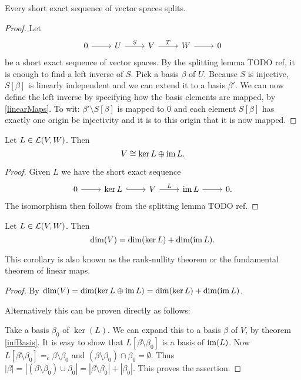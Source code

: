 \begin{theorem}
Every short exact sequence of vector spaces splits.
\end{theorem}
\begin{proof}
Let
\[ \begin{tikzcd}
0 \rar & U \rar{S} & V \rar{T} & W \rar & 0
\end{tikzcd} \]
be a short exact sequence of vector spaces.
By the splitting lemma TODO ref, it is enough to find a left inverse of $S$. Pick a basis $\beta$ of $U$. Because $S$ is injective, $S[\beta]$ is linearly independent and we can extend it to a basis $\beta'$. We can now define the left inverse by specifying how the basis elements are mapped, by \ref{linearMaps}. To wit: $\beta'\setminus S[\beta]$ is mapped to $0$ and each element $S[\beta]$ has exactly one origin be injectivity and it is to this origin that it is now mapped.
\end{proof}
\begin{corollary} \label{directSumKernelImage}
Let $L \in \operatorname{\mathcal{L}}(V,W)$. Then
\[ V \cong \ker L \oplus \operatorname{im} L. \]
\end{corollary}
\begin{proof}
Given $L$ we have the short exact sequence
\[ \begin{tikzcd}
0 \rar & \ker L \ar[r, hook] & V \rar{L} & \im L \rar & 0.
\end{tikzcd} \]
The isomorphism then follows from the splitting lemma TODO ref.
\end{proof}
\begin{corollary} \label{dimensionLinearMaps}
Let $L \in \operatorname{\mathcal{L}}(V,W)$. Then
\[ \dim(V) = \dim(\ker L) + \dim(\operatorname{im} L). \]
\end{corollary}
This corollary is also known as the rank-nullity theorem or the fundamental theorem of linear maps.
\begin{proof}
By $\dim(V) = \dim(\ker L \oplus \operatorname{im} L) = \dim(\ker L) + \dim(\operatorname{im} L)$.

Alternatively this can be proven directly as follows:

Take a basis $\beta_0$ of $\ker(L)$. We can expand this to a basis $\beta$ of $V$, by theorem \ref{infBasis}. It is easy to show that $L[\beta\setminus \beta_0]$ is a basis of $\operatorname{im}(L)$. Now $L[\beta\setminus \beta_0] =_c \beta\setminus \beta_0$ and $(\beta\setminus \beta_0) \cap \beta_0 = \emptyset$. Thus $|\beta| = |(\beta\setminus \beta_0) \cup \beta_0| = |\beta\setminus \beta_0| + |\beta_0|$. This proves the assertion.
\end{proof}
